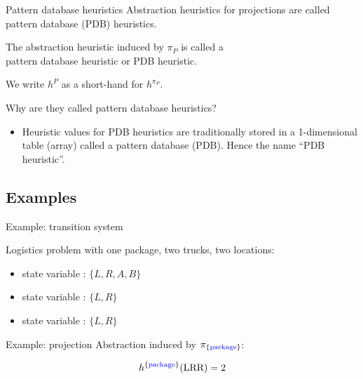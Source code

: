 \documentclass{gkibeamer}
\begin{document}
\begin{frame}{Pattern database heuristics}
  Abstraction heuristics for projections are called
  \alert{pattern database} (\alert{PDB}) heuristics.

  \begin{definition}
    The abstraction heuristic induced by $\pi_P$ is called a \\
    \alert{pattern database heuristic} or \alert{PDB heuristic}.

    We write \alert{$h^P$} as a short-hand for $h^{\pi_P}$.
  \end{definition}

  \medskip

  Why are they called \alert{pattern database heuristics}?
  \begin{itemize}
  \item Heuristic values for PDB heuristics are traditionally stored in
    a 1-dimensional table (array) called a \alert{pattern database}
    (PDB). Hence the name ``PDB heuristic''.
  \end{itemize}
\end{frame}

\subsection{Examples}

\begin{frame}{Example: transition system}
  \begin{center}
    \picfulltransitiongraph
  \end{center}
  Logistics problem with one package, two trucks, two locations:
  \begin{itemize}
  \item state variable : $\{L,R,A,B\}$
  \item state variable : $\{L,R\}$
  \item state variable : $\{L,R\}$
  \end{itemize}
\end{frame}

\begin{frame}{Example: projection}
  Abstraction induced by $\pi_{\{\text{{\color{blue} package}}\}}$:
  \begin{center}
    \picprojectionpackage
  \end{center}
  \[ h^{\{\text{{\color{blue} package}}\}}(\text{LRR}) = 2 \]
\end{frame}
\end{document}
